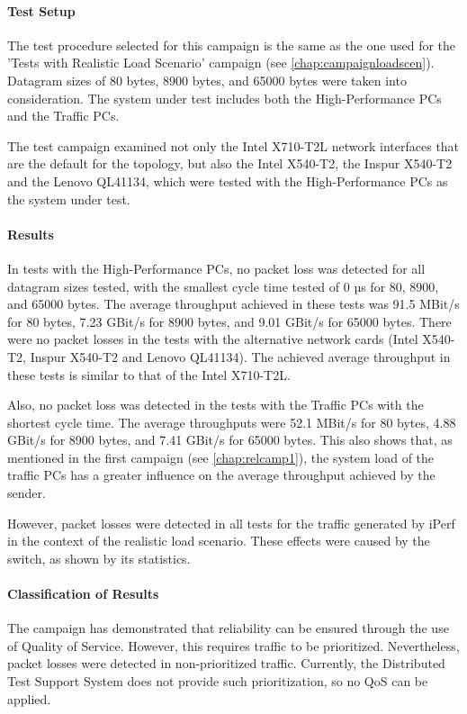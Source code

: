 \paragraph{Test Setup}
The test procedure selected for this campaign is the same as the one used for the 'Tests with Realistic Load Scenario' campaign (see \ref{chap:campaignloadscen}). Datagram sizes of 80 bytes, 8900 bytes, and 65000 bytes were taken into consideration. The system under test includes both the High-Performance PCs and the Traffic PCs.

The test campaign examined not only the Intel X710-T2L network interfaces that are the default for the topology, but also the Intel X540-T2, the Inspur X540-T2 and the Lenovo QL41134, which were tested with the High-Performance PCs as the system under test.

\paragraph{Results}
In tests with the High-Performance PCs, no packet loss was detected for all datagram sizes tested, with the smallest cycle time tested of 0 µs for 80, 8900, and 65000 bytes. The average throughput achieved in these tests was 91.5 MBit/s for 80 bytes, 7.23 GBit/s for 8900 bytes, and 9.01 GBit/s for 65000 bytes. There were no packet losses in the tests with the alternative network cards (Intel X540-T2, Inspur X540-T2 and Lenovo QL41134). The achieved average throughput in these tests is similar to that of the Intel X710-T2L.

Also, no packet loss was detected in the tests with the Traffic PCs with the shortest cycle time. The average throughputs were 52.1 MBit/s for 80 bytes, 4.88 GBit/s for 8900 bytes, and 7.41 GBit/s for 65000 bytes. This also shows that, as mentioned in the first campaign (see \ref{chap:relcamp1}), the system load of the traffic PCs has a greater influence on the average throughput achieved by the sender.

However, packet losses were detected in all tests for the traffic generated by iPerf in the context of the realistic load scenario. These effects were caused by the switch, as shown by its statistics.

\paragraph{Classification of Results}
The campaign has demonstrated that reliability can be ensured through the use of Quality of Service. However, this requires traffic to be prioritized. Nevertheless, packet losses were detected in non-prioritized traffic. Currently, the Distributed Test Support System does not provide such prioritization, so no QoS can be applied.

